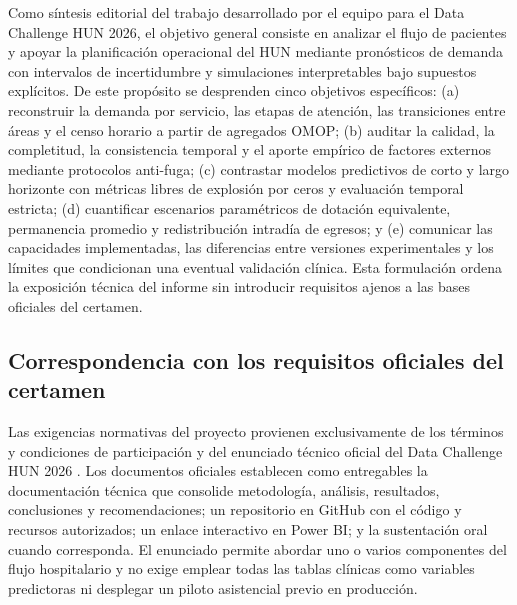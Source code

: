 Como síntesis editorial del trabajo desarrollado por el equipo para el Data Challenge HUN 2026, el objetivo general consiste en analizar el flujo de pacientes y apoyar la planificación operacional del HUN mediante pronósticos de demanda con intervalos de incertidumbre y simulaciones interpretables bajo supuestos explícitos. De este propósito se desprenden cinco objetivos específicos: (a) reconstruir la demanda por servicio, las etapas de atención, las transiciones entre áreas y el censo horario a partir de agregados OMOP; (b) auditar la calidad, la completitud, la consistencia temporal y el aporte empírico de factores externos mediante protocolos anti-fuga; (c) contrastar modelos predictivos de corto y largo horizonte con métricas libres de explosión por ceros y evaluación temporal estricta; (d) cuantificar escenarios paramétricos de dotación equivalente, permanencia promedio y redistribución intradía de egresos; y (e) comunicar las capacidades implementadas, las diferencias entre versiones experimentales y los límites que condicionan una eventual validación clínica. Esta formulación ordena la exposición técnica del informe sin introducir requisitos ajenos a las bases oficiales del certamen.

\subsection{Correspondencia con los requisitos oficiales del certamen}

Las exigencias normativas del proyecto provienen exclusivamente de los términos y condiciones de participación y del enunciado técnico oficial del Data Challenge HUN 2026 \parencite{hun2026terminos,hun2026reto}. Los documentos oficiales establecen como entregables la documentación técnica que consolide metodología, análisis, resultados, conclusiones y recomendaciones; un repositorio en GitHub con el código y recursos autorizados; un enlace interactivo en Power BI; y la sustentación oral cuando corresponda. El enunciado permite abordar uno o varios componentes del flujo hospitalario y no exige emplear todas las tablas clínicas como variables predictoras ni desplegar un piloto asistencial previo en producción.

